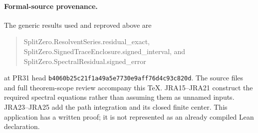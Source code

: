 \paragraph{Formal-source provenance.}
The generic results used and reproved above are
\begin{quote}\ttfamily
SplitZero.ResolventSeries.residual\_exact,\\
SplitZero.SignedTraceEnclosure.signed\_interval, and\\
SplitZero.SpectralResidual.signed\_error
\end{quote}
\noindent at PR31 head
\texttt{b4060b25c21f1a49a5e7730e9aff76d4c93c820d}.
The source files and full theorem-scope review accompany this TeX.
JRA15--JRA21 construct the required spectral equations rather than
assuming them as unnamed inputs. JRA23--JRA25 add the path integration
and its closed finite center. This application has a written proof;
it is not represented as an already compiled Lean declaration.
